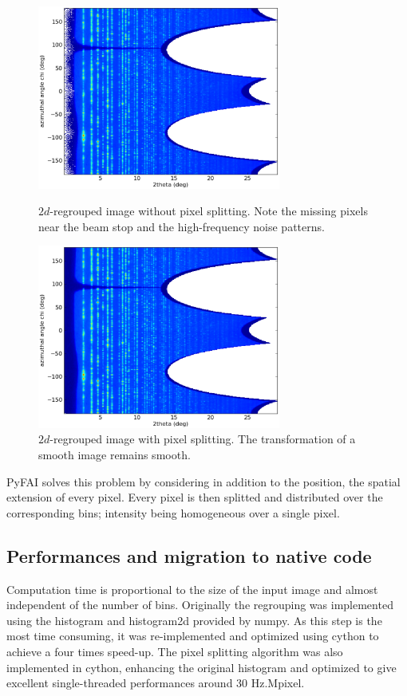 \documentclass[a4paper]{jpconf}
\begin{document}
\begin{center}
\begin{figure}[h]
\begin{minipage}{8cm}
\includegraphics[width=8cm]{img/2Dhistogram.eps}
\caption{\label{rough}$2d$-regrouped image without pixel splitting. Note the
missing pixels near the beam stop and the high-frequency noise patterns.}
\end{minipage}\hspace{5mm}
\begin{minipage}{8cm}
\includegraphics[width=8cm]{img/2DwithSplit.eps}
\caption{\label{smooth}$2d$-regrouped image with pixel splitting. The
transformation of a smooth image remains smooth.}
\end{minipage}
\end{figure}
\end{center}

PyFAI solves this problem by considering in addition to the position, the
spatial extension of every pixel. Every pixel is then splitted and distributed
over the corresponding bins; intensity being homogeneous over a
single pixel.

\subsection{Performances and migration to native code}
Computation time is proportional to the size of the input image and almost
independent of the number of bins. Originally the regrouping was implemented
using the histogram and histogram2d provided by numpy\cite{numpy}. As this step
is the most  time consuming, it was re-implemented and optimized using
cython\cite{cython} to achieve  a  four times speed-up.
The pixel splitting algorithm was also implemented in cython, enhancing the
original histogram and optimized to give excellent single-threaded performances
around 30 Hz.Mpixel.
\end{document}
